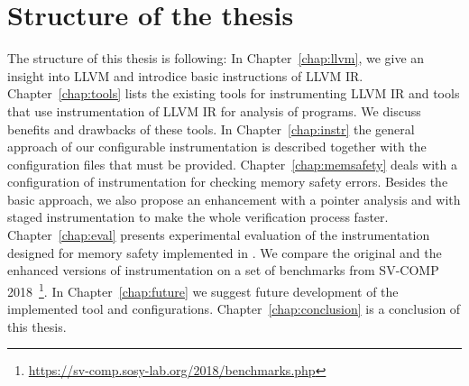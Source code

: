 \section{Structure of the thesis}

The structure of this thesis is following: In Chapter~\ref{chap:llvm}, we give
an insight into LLVM and introdice basic instructions of LLVM IR.
Chapter~\ref{chap:tools} lists the existing tools for instrumenting LLVM IR and
tools that use instrumentation of LLVM IR for analysis of programs. We discuss
benefits and drawbacks of these tools. In Chapter~\ref{chap:instr} the general
approach of our configurable instrumentation is described together with the
configuration files that must be provided. Chapter~\ref{chap:memsafety} deals
with a configuration of instrumentation for checking memory safety errors.
Besides the basic approach, we also propose an enhancement with a pointer
analysis and with staged instrumentation to make the whole verification process
faster. Chapter~\ref{chap:eval} presents experimental evaluation of the
instrumentation designed for memory safety implemented in \symbiotic. We
compare the original and the enhanced versions of instrumentation on a set of
benchmarks from SV-COMP
2018~\footnote{\url{https://sv-comp.sosy-lab.org/2018/benchmarks.php}}.  In
Chapter~\ref{chap:future} we suggest future development of the implemented tool
and configurations. Chapter~\ref{chap:conclusion} is a conclusion of this
thesis.
